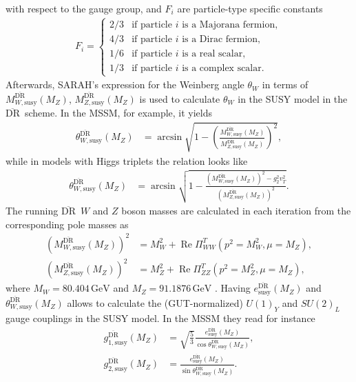 \documentclass[final,3p,11pt,pdflatex]{elsarticle}
\newcommand{\textoverline}[1]{$\overline{\mbox{#1}}$}
\newcommand{\DRbar}{\textoverline{DR}\xspace}
\newcommand{\unit}[1]{\,\text{#1}}      %
\DeclareMathOperator{\re}{Re}
\begin{document}
with respect to the gauge group, and $F_i$ are particle-type specific
constants \cite{Hall:1980kf}
%
\begin{align}
  F_i =
  \begin{cases}
    2/3 & \text{if particle $i$ is a Majorana fermion},\\
    4/3 & \text{if particle $i$ is a Dirac fermion},\\
    1/6 & \text{if particle $i$ is a real scalar},\\
    1/3 & \text{if particle $i$ is a complex scalar}.
  \end{cases}
\end{align}
%
Afterwards, SARAH's expression for the Weinberg angle $\theta_W$ in
terms of $M_{W,\text{susy}}^{\text{\DRbar}}(M_Z)$,
$M_{Z,\text{susy}}^{\text{\DRbar}}(M_Z)$ is used to calculate
$\theta_W$ in the SUSY model in the \DRbar\ scheme.  In the MSSM, for
example, it yields
%
\begin{align}
  \theta_{W,\text{susy}}^{\text{\DRbar}}(M_Z) &= \arcsin\sqrt{1
    -
    \left(\frac{M_{W,\text{susy}}^{\text{\DRbar}}(M_Z)}{M_{Z,\text{susy}}^{\text{\DRbar}}(M_Z)}\right)^2}
  ,
\end{align}
%
while in models with Higgs triplets the relation looks like
%
\begin{align}
  \theta_{W,\text{susy}}^{\text{\DRbar}}(M_Z) &= \arcsin\sqrt{1 -
    \frac{\left(M_{W,\text{susy}}^{\text{\DRbar}}(M_Z)\right)^2 -
      g_2^2v_T^2}{\left(M_{Z,\text{susy}}^{\text{\DRbar}}(M_Z)\right)^2}}.
\end{align}
%
The running \DRbar\ $W$ and $Z$ boson masses are calculated in each
iteration from the corresponding pole masses as
%
\begin{align}
  \left(M_{W,\text{susy}}^{\text{\DRbar}}(M_Z)\right)^2 &=
  M_W^2 + \re \Pi_{WW}^T(p^2 = M_W^2, \mu=M_Z) ,\\
  \left(M_{Z,\text{susy}}^{\text{\DRbar}}(M_Z)\right)^2 &=
  M_Z^2 + \re \Pi_{ZZ}^T(p^2 = M_Z^2, \mu=M_Z) ,
\end{align}
%
where $M_W = 80.404\unit{GeV}$ and $M_Z = 91.1876\unit{GeV}$
\cite{Beringer:1900zz}.  Having $e_{\text{susy}}^{\text{\DRbar}}(M_Z)$
and $\theta_{W,\text{susy}}^{\text{\DRbar}}(M_Z)$ allows to calculate
the (GUT-normalized) $U(1)_Y$ and $SU(2)_L$ gauge couplings in the
SUSY model.  In the MSSM they read for instance
%
\begin{align}
  g_{1,\text{susy}}^{\text{\DRbar}}(M_Z) &=
  \sqrt{\frac{5}{3}} \frac{e_{\text{susy}}^{\text{\DRbar}}(M_Z)}{\cos\theta_{W,\text{susy}}^{\text{\DRbar}}(M_Z)} ,\\
  g_{2,\text{susy}}^{\text{\DRbar}}(M_Z) &=
  \frac{e_{\text{susy}}^{\text{\DRbar}}(M_Z)}{\sin\theta_{W,\text{susy}}^{\text{\DRbar}}(M_Z)} .
\end{align}
\end{document}
